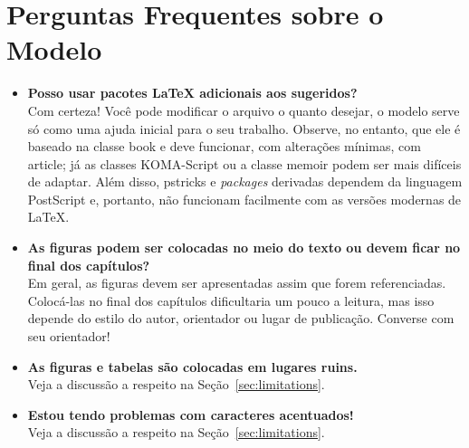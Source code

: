\section{Perguntas Frequentes sobre o Modelo}

\begin{itemize}

\item \textbf{Posso usar pacotes \LaTeX{} adicionais aos sugeridos?}\\
Com certeza! Você pode modificar o arquivo o quanto desejar, o modelo serve só como uma ajuda inicial para o seu trabalho. Observe, no entanto, que ele é baseado na classe \textsf{book} e deve funcionar, com alterações mínimas, com \textsf{article}; já as classes \textsf{KOMA-Script} ou a classe \textsf{memoir} podem ser mais difíceis de adaptar. Além disso, \textsf{pstricks} e \textit{packages} derivadas dependem da linguagem PostScript e, portanto, não funcionam facilmente com as versões modernas de \LaTeX{}.

\item \textbf{As figuras podem ser colocadas no meio do texto ou devem ficar no final dos capítulos?}\\
Em geral, as figuras devem ser apresentadas assim que forem referenciadas. Colocá-las no final dos capítulos dificultaria um pouco a leitura, mas isso depende do estilo do autor, orientador ou lugar de publicação. Converse com seu orientador!

\item \textbf{As figuras e tabelas são colocadas em lugares ruins.}\\
Veja a discussão a respeito na Seção~\ref{sec:limitations}.

\item \textbf{Estou tendo problemas com caracteres acentuados!}\\
Veja a discussão a respeito na Seção~\ref{sec:limitations}.


\end{itemize}
